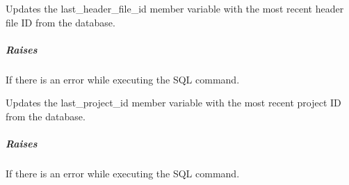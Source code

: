 \documentclass[letterpaper,10pt,english]{sphinxmanual}
\begin{document}
\begin{fulllineitems}
\begin{fulllineitems}
\label{\detokenize{main.db_operations:main.db_operations.db_insertion_handler.DBInsertionHandler.update_last_header_file_id}}
\pysigstartsignatures
{}
\pysigstopsignatures
\sphinxAtStartPar
Updates the last\_header\_file\_id member variable with the most recent header file ID from the database.


\subparagraph{Raises}
\label{\detokenize{main.db_operations:id10}}\begin{description}
\sphinxAtStartPar
If there is an error while executing the SQL command.

\end{description}

\end{fulllineitems}


\begin{fulllineitems}
\label{\detokenize{main.db_operations:main.db_operations.db_insertion_handler.DBInsertionHandler.update_last_project_id}}
\pysigstartsignatures
{}
\pysigstopsignatures
\sphinxAtStartPar
Updates the last\_project\_id member variable with the most recent project ID from the database.


\subparagraph{Raises}
\label{\detokenize{main.db_operations:id11}}\begin{description}
\sphinxAtStartPar
If there is an error while executing the SQL command.

\end{description}

\end{fulllineitems}



\end{fulllineitems}
\end{document}
